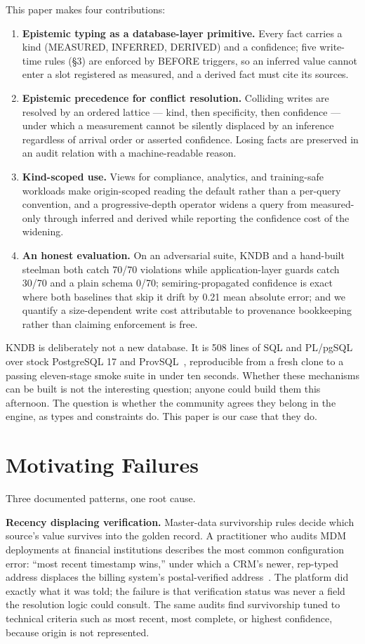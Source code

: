 \documentclass[sigconf,nonacm]{acmart}
\begin{document}
This paper makes four contributions:
\begin{enumerate}
\item \textbf{Epistemic typing as a database-layer primitive.} Every fact carries a kind (MEASURED, INFERRED, DERIVED) and a confidence; five write-time rules (\S3) are enforced by BEFORE triggers, so an inferred value cannot enter a slot registered as measured, and a derived fact must cite its sources.
\item \textbf{Epistemic precedence for conflict resolution.} Colliding writes are resolved by an ordered lattice --- kind, then specificity, then confidence --- under which a measurement cannot be silently displaced by an inference regardless of arrival order or asserted confidence. Losing facts are preserved in an audit relation with a machine-readable reason.
\item \textbf{Kind-scoped use.} Views for compliance, analytics, and training-safe workloads make origin-scoped reading the default rather than a per-query convention, and a progressive-depth operator widens a query from measured-only through inferred and derived while reporting the confidence cost of the widening.
\item \textbf{An honest evaluation.} On an adversarial suite, KNDB and a hand-built steelman both catch 70/70 violations while application-layer guards catch 30/70 and a plain schema 0/70; semiring-propagated confidence is exact where both baselines that skip it drift by 0.21 mean absolute error; and we quantify a size-dependent write cost attributable to provenance bookkeeping rather than claiming enforcement is free.
\end{enumerate}

KNDB is deliberately not a new database. It is 508 lines of SQL and PL/pgSQL over stock PostgreSQL 17 and ProvSQL~\cite{provsql}, reproducible from a fresh clone to a passing eleven-stage smoke suite in under ten seconds. Whether these mechanisms can be built is not the interesting question; anyone could build them this afternoon. The question is whether the community agrees they belong in the engine, as types and constraints do. This paper is our case that they do.

\section{Motivating Failures}
Three documented patterns, one root cause.

\noindent\textbf{Recency displacing verification.} Master-data survivorship rules decide which source's value survives into the golden record. A practitioner who audits MDM deployments at financial institutions describes the most common configuration error: ``most recent timestamp wins,'' under which a CRM's newer, rep-typed address displaces the billing system's postal-verified address~\cite{mdm}. The platform did exactly what it was told; the failure is that verification status was never a field the resolution logic could consult. The same audits find survivorship tuned to technical criteria such as most recent, most complete, or highest confidence, because origin is not represented.
\end{document}

